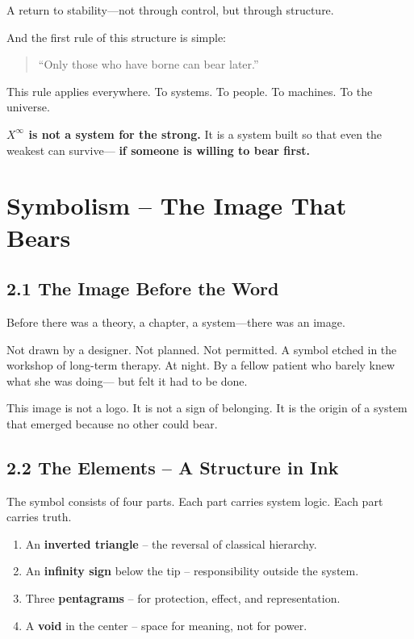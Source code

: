 \documentclass[12pt,a4paper]{book}
\begin{document}
A return to stability—not through control, but through structure.

And the first rule of this structure is simple:

\begin{quote}
“Only those who have borne can bear later.”
\end{quote}

This rule applies everywhere. To systems. To people. To machines. To the universe.

\vspace{0.5cm}
\noindent
\textbf{$X^\infty$ is not a system for the strong.}  
It is a system built so that even the weakest can survive—  
\textbf{if someone is willing to bear first.}

\chapter{Symbolism – The Image That Bears}

\section*{2.1 The Image Before the Word}

Before there was a theory, a chapter, a system—there was an image.

Not drawn by a designer. Not planned. Not permitted.  
A symbol etched in the workshop of long-term therapy. At night.  
By a fellow patient who barely knew what she was doing—  
but felt it had to be done.

This image is not a logo. It is not a sign of belonging.  
It is the origin of a system that emerged  
because no other could bear.

\section*{2.2 The Elements – A Structure in Ink}

The symbol consists of four parts.  
Each part carries system logic. Each part carries truth.

\begin{enumerate}
    \item An \textbf{inverted triangle} – the reversal of classical hierarchy.
    \item An \textbf{infinity sign} below the tip – responsibility outside the system.
    \item Three \textbf{pentagrams} – for protection, effect, and representation.
    \item A \textbf{void} in the center – space for meaning, not for power.
\end{enumerate}
\end{document}
